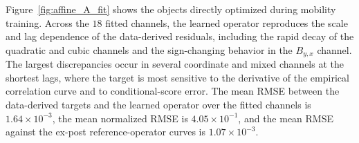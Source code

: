 \documentclass[11pt,twoside,fleqn]{article}
\begin{document}
Figure~\ref{fig:affine_A_fit} shows the objects directly optimized during mobility training. Across the \(18\) fitted channels, the learned operator reproduces the scale and lag dependence of the data-derived residuals, including the rapid decay of the quadratic and cubic channels and the sign-changing behavior in the \(B_{y,x}\) channel. The largest discrepancies occur in several coordinate and mixed channels at the shortest lags, where the target is most sensitive to the derivative of the empirical correlation curve and to conditional-score error. The mean RMSE between the data-derived targets and the learned operator over the fitted channels is \(1.64\times10^{-3}\), the mean normalized RMSE is \(4.05\times10^{-1}\), and the mean RMSE against the ex-post reference-operator curves is \(1.07\times10^{-3}\).



\end{document}
